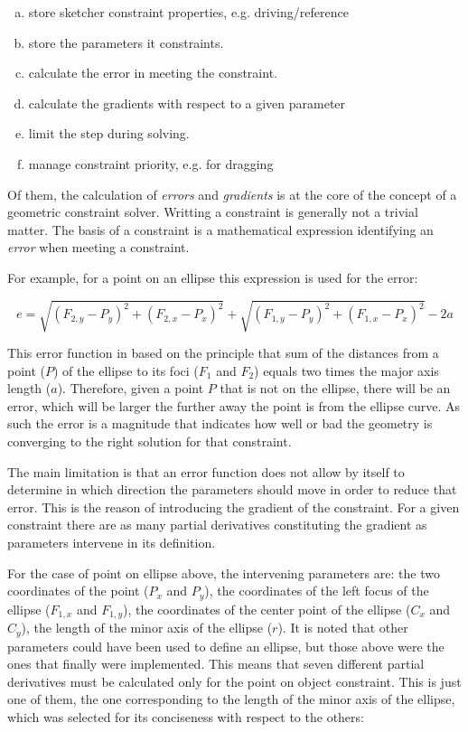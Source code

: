 \documentclass[12pt,twoside,a4paper]{book}
\begin{document}
    \begin{enumerate}[a)]
    \item store sketcher constraint properties, e.g. driving/reference
    \item store the parameters it constraints.
    \item calculate the error in meeting the constraint.
    \item calculate the gradients with respect to a given parameter
    \item limit the step during solving.
    \item manage constraint priority, e.g. for dragging
    \end{enumerate}

    Of them, the calculation of \emph{errors} and \emph{gradients} is at the core of the concept of a geometric constraint solver. Writting a constraint is generally not a trivial matter. The basis of a constraint is a mathematical expression identifying an \emph{error} when meeting a constraint.

    For example, for a point on an ellipse this expression is used for the error:

    \begin{equation}
        e = \sqrt{(F_{2,y}-P_y)^2 + (F_{2,x}-P_x)^2}+\sqrt{(F_{1,y}-P_y)^2 + (F_{1,x}-P_x)^2} - 2a
    \end{equation}

    This error function in based on the principle that sum of the distances from a point ($P$) of the ellipse to its foci ($F_1$ and $F_2$) equals two times the major axis length ($a$). Therefore, given a point $P$ that is not on the ellipse, there will be an error, which will be larger the further away the point is from the ellipse curve. As such the error is a magnitude that indicates how well or bad the geometry is converging to the right solution for that constraint.

    The main limitation is that an error function does not allow by itself to determine in which direction the parameters should move in order to reduce that error. This is the reason of introducing the gradient of the constraint. For a given constraint there are as many partial derivatives constituting the gradient as parameters intervene in its definition.

    For the case of point on ellipse above, the intervening parameters are: the two coordinates of the point ($P_x$ and $P_y$), the coordinates of the left focus of the ellipse ($F_{1,x}$ and $F_{1,y}$), the coordinates of the center point of the ellipse ($C_x$ and $C_y$), the length of the minor axis of the ellipse ($r$). It is noted that other parameters could have been used to define an ellipse, but those above were the ones that finally were implemented. This means that seven different partial derivatives must be calculated only for the point on object constraint. This is just one of them, the one corresponding to the length of the minor axis of the ellipse, which was selected for its conciseness with respect to the others:
\end{document}
